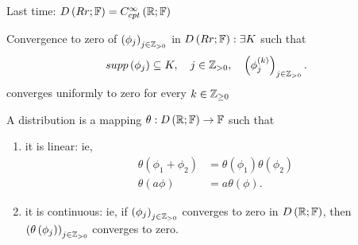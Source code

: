 
Last time: $D\left( Rr; \mathbb{F} \right) = C^{\infty}_{cpt}\left( \mathbb{R};\mathbb{F} \right) $ 

Convergence to zero of $\left( \phi _{j} \right) _{j \in \mathbb{Z}_{>0}}$ in $D\left( Rr; \mathbb{F} \right): \exists K $ such that 
\[
	supp\left( \phi_{j} \right) \subseteq K, \quad j \in  \mathbb{Z}_{>0}, \quad \left( \phi_{j}^{\left( k \right) } \right) _{j \in \mathbb{Z}_{>0}}
.\] converges uniformly to zero for every $k \in  \mathbb{Z}_{\ge 0}$ 

\begin{definition}
	A distribution is a mapping $\theta : D\left( \mathbb{R}; \mathbb{F} \right)  \to \mathbb{F} $ such that 
	\begin{enumerate}
		\item it is linear: ie, 
			\begin{align*}
				\theta \left( \phi_1 + \phi_2 \right) &= \theta\left( \phi_1 \right) \theta\left( \phi_2 \right)  \\
				\theta\left( a\phi \right) &= a \theta\left( \phi \right) 
			.\end{align*}
		\item it is continuous: ie, if $\left( \phi_{j} \right) _{j \in  \mathbb{Z}_{>0}}$ converges to zero in $D\left( \mathbb{R}; \mathbb{F} \right) $, then $\left( \theta\left( \phi_{j} \right)  \right) _{j \in  \mathbb{Z}_{>0}}$ converges to zero. 
	\end{enumerate}
\end{definition}

